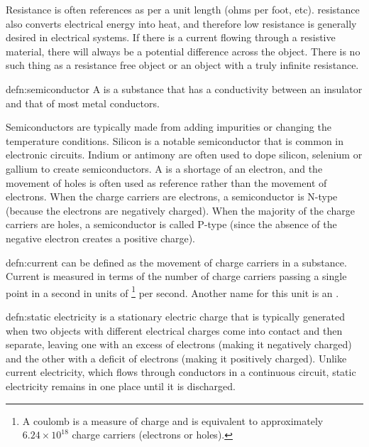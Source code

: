 Resistance is often references as per a unit length (ohms per foot, etc). resistance also converts electrical energy into heat, and therefore low resistance is generally desired in electrical systems. If there is a current flowing through a resistive material, there will always be a potential difference across the object. There is no such thing as a resistance free object or an object with a truly infinite resistance.

\begin{defn}[Semiconductor]{defn:semiconductor}
A  is a substance that has a conductivity between an insulator and that of most metal conductors.
\end{defn}

Semiconductors are typically made from adding impurities or changing the temperature conditions. Silicon is a notable semiconductor that is common in electronic circuits. Indium or antimony are often used to dope silicon, selenium or gallium to create semiconductors. A  is a shortage of an electron, and the movement of holes is often used as reference rather than the movement of electrons. When the charge carriers are electrons, a semiconductor is N-type (because the electrons are negatively charged). When the majority of the charge carriers are holes, a semiconductor is called P-type (since the absence of the negative electron creates a positive charge).

\begin{defn}[Current]{defn:current}
 can be defined as the movement of charge carriers in a substance. Current is measured in terms of the number of charge carriers passing a single point in a second in units of \footnote{A coulomb is a measure of charge and is equivalent to approximately $6.24 \times 10^{18}$ charge carriers (electrons or holes).} per second. Another name for this unit is an .
\end{defn}

\begin{defn}{defn:static electricity}
 is a stationary electric charge that is typically generated when two objects with different electrical charges come into contact and then separate, leaving one with an excess of electrons (making it negatively charged) and the other with a deficit of electrons (making it positively charged). Unlike current electricity, which flows through conductors in a continuous circuit, static electricity remains in one place until it is discharged.
\end{defn}

